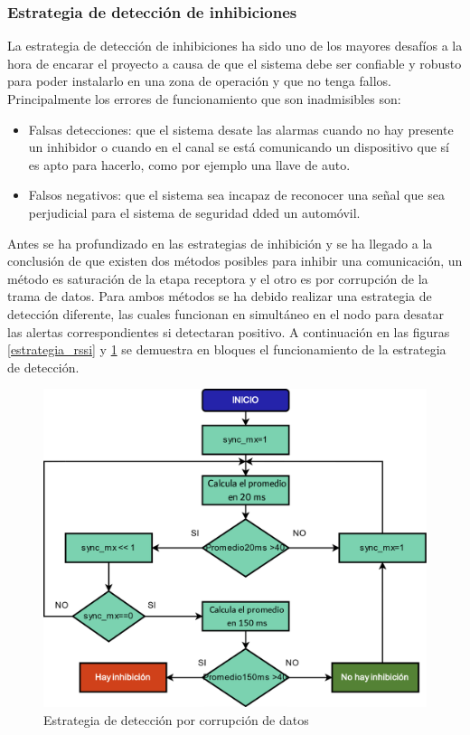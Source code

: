 \subsubsection{Estrategia de detección de inhibiciones}

La estrategia de detección de inhibiciones ha sido uno de los mayores desafíos a la hora de encarar el proyecto a causa de que
el sistema debe ser confiable y robusto para poder instalarlo en una zona de operación y que no tenga fallos. Principalmente
los errores de funcionamiento que son inadmisibles son: 
\begin{itemize}
	\item Falsas detecciones: que el sistema desate las alarmas cuando no hay presente un inhibidor o cuando en el canal se está
	comunicando un dispositivo que sí es apto para hacerlo, como por ejemplo una llave de auto.
	\item Falsos negativos: que el sistema sea incapaz de reconocer una señal que sea perjudicial para el sistema de seguridad
	dded un automóvil.
\end{itemize} 

Antes se ha profundizado en las estrategias de inhibición y se ha llegado a la conclusión de que existen dos métodos posibles
para inhibir una comunicación, un método es saturación de la etapa receptora y el otro es por corrupción de la trama de datos.
Para ambos métodos se ha debido realizar una estrategia de detección diferente, las cuales funcionan en simultáneo en el nodo
para desatar las alertas correspondientes si detectaran positivo. A continuación en las figuras \ref{estrategia_rssi} 
y \ref{estrategia_datos} se demuestra en bloques el funcionamiento de la estrategia de detección.

\begin{figure}
	\centering
	\includegraphics[scale=0.43]{images/nodos/estrategia_datos.png}
    \caption{Estrategia de detección por corrupción de datos}
	\label{estrategia_datos}
\end{figure}

